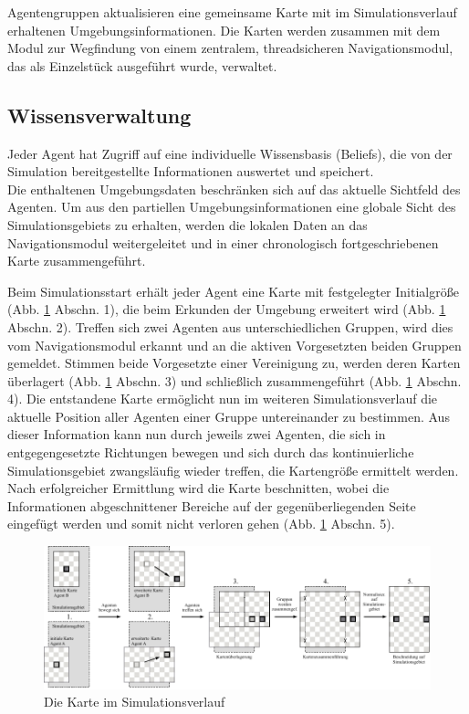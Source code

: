 \documentclass[runningheads]{llncs}
\begin{document}
Agentengruppen aktualisieren eine gemeinsame Karte mit im Simulationsverlauf erhaltenen Umgebungsinformationen. Die Karten werden zusammen mit dem Modul zur Wegfindung von einem zentralem, threadsicheren Navigationsmodul, das als Einzelstück ausgeführt wurde, verwaltet. 


\subsection{Wissensverwaltung}\label{wissensverwaltung}
Jeder Agent hat Zugriff auf eine individuelle Wissensbasis (Beliefs), die von der Simulation bereitgestellte Informationen auswertet und speichert. \\
Die enthaltenen Umgebungsdaten beschränken sich auf das aktuelle Sichtfeld des Agenten.
Um aus den partiellen Umgebungsinformationen eine globale Sicht des Simulationsgebiets zu erhalten, werden die lokalen Daten an das Navigationsmodul weitergeleitet und in einer chronologisch fortgeschriebenen Karte zusammengeführt.

Beim Simulationsstart erhält jeder Agent eine Karte mit festgelegter Initialgröße (Abb. \ref{Karte} Abschn. 1), die beim Erkunden der Umgebung erweitert wird (Abb. \ref{Karte} Abschn. 2). Treffen sich zwei Agenten aus unterschiedlichen Gruppen, wird dies vom Navigationsmodul erkannt und an die aktiven Vorgesetzten beiden Gruppen gemeldet. Stimmen beide Vorgesetzte einer Vereinigung zu, werden deren Karten überlagert (Abb. \ref{Karte} Abschn. 3) und schließlich zusammengeführt (Abb. \ref{Karte} Abschn. 4). Die entstandene Karte ermöglicht nun im weiteren Simulationsverlauf die aktuelle Position aller Agenten einer Gruppe untereinander zu bestimmen. Aus dieser Information kann nun durch jeweils zwei Agenten, die sich in entgegengesetzte Richtungen bewegen und sich durch das kontinuierliche Simulationsgebiet zwangsläufig wieder treffen, die Kartengröße ermittelt werden. Nach erfolgreicher Ermittlung wird die Karte beschnitten, wobei die Informationen abgeschnittener Bereiche auf der gegenüberliegenden Seite eingefügt werden und somit nicht verloren gehen (Abb. \ref{Karte} Abschn. 5).
\begin{figure}[h]
\includegraphics[scale=0.8]{./Referenzen/Kartenmerge.pdf}
\caption{Die Karte im Simulationsverlauf}
\label{Karte}
\end{figure}
\end{document}
